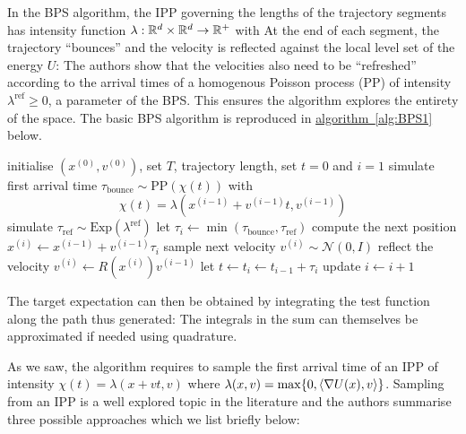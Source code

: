 In the BPS algorithm, the IPP governing the lengths of the trajectory segments has intensity function $\lambda:\mathbb R^{d}\times\mathbb R^{d}\to\mathbb R^{+}$ with
%
%
At the end of each segment, the trajectory ``bounces'' and the velocity is reflected against the local level set of the energy $U$:
The authors show that the velocities also need to be ``refreshed'' according to the arrival times of a homogenous Poisson process (PP) of intensity $\lambda^{\text{ref}}\ge 0$, a parameter of the BPS. This ensures the algorithm explores the entirety of the space. The basic BPS algorithm is reproduced in \hyperref[alg:BPS1]{algorithm~\ref*{alg:BPS1}} below.

\begin{algorithm}[!h]\small
	\caption{\label{alg:BPS1}\small {}}
	\begin{algorithmic}[1]
	\State initialise $(x^{(0)},v^{(0)})$, set $T$, trajectory length, set $t=0$ and $i=1$
		\State simulate first arrival time $\tau_{\text{bounce}} \sim \text{PP}(\chi(t))$  with
		$$ \chi(t) = \lambda(x^{(i-1)}+v^{(i-1)}t,v^{(i-1)})$$
		\State simulate $\tau_{\text{ref}}\sim \mathrm{Exp}(\lambda^{\text{ref}})$
		\State let $\tau_{i}\leftarrow \min(\tau_{\text{bounce}},\tau_{\text{ref}})$
		\State compute the next position $x^{(i)}\leftarrow x^{(i-1)}+v^{(i-1)}\tau_{i}$
			\State sample next velocity $v^{(i)}\sim \mathcal N(0,I)$		
			\State reflect the velocity $v^{(i)}\leftarrow R(x^{(i)})v^{(i-1)}$
		\EndIf
		\State let $t\leftarrow t_{i}\leftarrow t_{i-1}+\tau_{i}$
		\State update $i\leftarrow i+1$
	\EndWhile
	\end{algorithmic}
\end{algorithm}

The target expectation can then be obtained by integrating the test function along the path thus generated:
The integrals in the sum can themselves be approximated if needed using quadrature.

As we saw, the algorithm requires to sample the first arrival time of an IPP of intensity $\chi(t)=\lambda(x+vt,v)$ where $\lambda(x,v)=\max\{0,\left\langle \nabla U(x),v \right\rangle\}$. Sampling from an IPP is a well explored topic in the literature and the authors summarise three possible approaches which we list briefly below:

